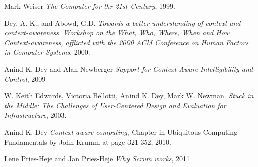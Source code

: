 \documentclass[../report.tex]{subfiles}
\begin{document}
\graphicspath{{img/}{../img/}}
\begin{thebibliography}{9}

  Mark Weiser
  \emph{The Computer for thr 21st Century}, 1999.

  Dey, A. K., and Abowd, G.D.
  \emph{Towards a better understanding of context and context-awareness. Workshop on the What, Who, Where, When and How Context-awareness, afflicted with the 2000 ACM Conference on Human Factors in Computer Systems},
  2000.
  
    Anind K. Dey and Alan Newberger
    \emph{Support for Context-Aware Intelligibility and Control}, 2009
  
  W. Keith Edwards, Victoria Bellotti, Anind K. Dey,
  Mark W. Newman.
  \emph{Stuck in the Middle: The Challenges of
  User-Centered Design and Evaluation for Infrastructure},
  2003.
  
    Anind K. Dey
    \emph{Context-aware computing}, Chapter in Ubiquitous Computing Fundamentals by John Krumm at page 321-352, 2010.
    
	Lene Pries-Heje and Jan Pries-Heje
	\textit{Why Scrum works}, 2011

\end{thebibliography}
\end{document}

